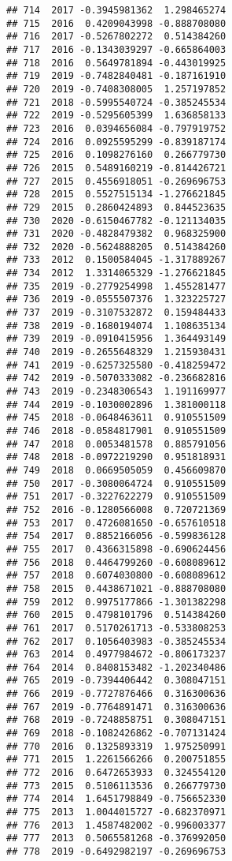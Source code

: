 \documentclass[
]{article}
\begin{document}
\begin{verbatim}
## 714  2017 -0.3945981362  1.298465274
## 715  2016  0.4209043998 -0.888708080
## 716  2017 -0.5267802272  0.514384260
## 717  2016 -0.1343039297 -0.665864003
## 718  2016  0.5649781894 -0.443019925
## 719  2019 -0.7482840481 -0.187161910
## 720  2019 -0.7408308005  1.257197852
## 721  2018 -0.5995540724 -0.385245534
## 722  2019 -0.5295605399  1.636858133
## 723  2016  0.0394656084 -0.797919752
## 724  2016  0.0925595299 -0.839187174
## 725  2016  0.1098276160  0.266779730
## 726  2015  0.5489160219 -0.814426721
## 727  2015  0.4556918051 -0.269696753
## 728  2015  0.5527515134 -1.276621845
## 729  2015  0.2860424893  0.844523635
## 730  2020 -0.6150467782 -0.121134035
## 731  2020 -0.4828479382  0.968325900
## 732  2020 -0.5624888205  0.514384260
## 733  2012  0.1500584045 -1.317889267
## 734  2012  1.3314065329 -1.276621845
## 735  2019 -0.2779254998  1.455281477
## 736  2019 -0.0555507376  1.323225727
## 737  2019 -0.3107532872  0.159484433
## 738  2019 -0.1680194074  1.108635134
## 739  2019 -0.0910415956  1.364493149
## 740  2019 -0.2655648329  1.215930431
## 741  2019 -0.6257325580 -0.418259472
## 742  2019 -0.5070333082 -0.236682816
## 743  2019 -0.2348306543  1.191169977
## 744  2019 -0.1030002896  1.381000118
## 745  2018 -0.0648463611  0.910551509
## 746  2018 -0.0584817901  0.910551509
## 747  2018  0.0053481578  0.885791056
## 748  2018 -0.0972219290  0.951818931
## 749  2018  0.0669505059  0.456609870
## 750  2017 -0.3080064724  0.910551509
## 751  2017 -0.3227622279  0.910551509
## 752  2016 -0.1280566008  0.720721369
## 753  2017  0.4726081650 -0.657610518
## 754  2017  0.8852166056 -0.599836128
## 755  2017  0.4366315898 -0.690624456
## 756  2018  0.4464799260 -0.608089612
## 757  2018  0.6074030800 -0.608089612
## 758  2015  0.4438671021 -0.888708080
## 759  2012  0.9975177866 -1.301382298
## 760  2015  0.4798101796  0.514384260
## 761  2017  0.5170261713 -0.533808253
## 762  2017  0.1056403983 -0.385245534
## 763  2014  0.4977984672 -0.806173237
## 764  2014  0.8408153482 -1.202340486
## 765  2019 -0.7394406442  0.308047151
## 766  2019 -0.7727876466  0.316300636
## 767  2019 -0.7764891471  0.316300636
## 768  2019 -0.7248858751  0.308047151
## 769  2018 -0.1082426862 -0.707131424
## 770  2016  0.1325893319  1.975250991
## 771  2015  1.2261566266  0.200751855
## 772  2016  0.6472653933  0.324554120
## 773  2015  0.5106113536  0.266779730
## 774  2014  1.6451798849 -0.756652330
## 775  2013  1.0044015727 -0.682370971
## 776  2013  1.4587482002 -0.996003377
## 777  2013  0.5065581268 -0.376992050
## 778  2019 -0.6492982197 -0.269696753

\end{verbatim}
\end{document}
